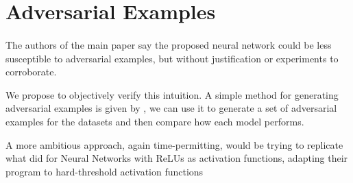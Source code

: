 \section{Adversarial Examples}\label{adversary}
\paragraph{}
The authors of the main paper say the proposed neural network could be less susceptible to adversarial examples, but without justification or experiments to corroborate.

We propose to objectively verify this intuition. A simple method for generating adversarial examples is given by \cite{goodfellow2014explaining}, we can use it to generate a set of adversarial examples for the datasets and then compare how each model performs.

A more ambitious approach, again time-permitting, would be trying to replicate what \cite{fischetti2017deep} did for Neural Networks with ReLUs as activation functions, adapting their program to hard-threshold activation functions